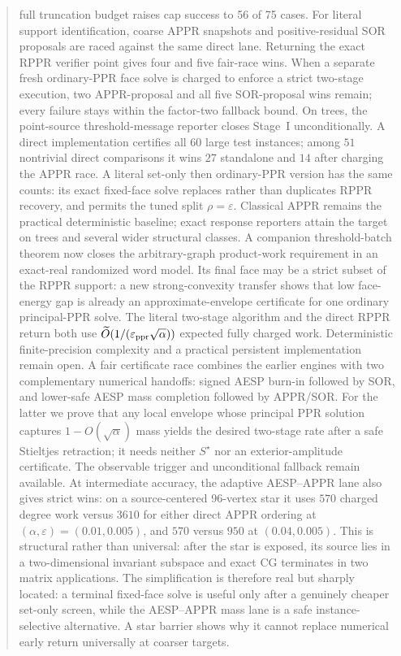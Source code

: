 \documentclass[11pt]{article}
\begin{document}
\begin{abstract}
full truncation budget raises cap success to 56 of 75 cases.
For literal support identification, coarse APPR snapshots and
positive-residual SOR proposals are raced against the same direct lane.
Returning the exact RPPR verifier point gives four and five fair-race wins.
When a separate fresh ordinary-PPR face solve is charged to enforce a strict
two-stage execution, two APPR-proposal and all five SOR-proposal wins remain;
every failure stays within the factor-two fallback bound.
On trees, the point-source threshold-message reporter closes Stage~I
unconditionally.  A direct implementation certifies all $60$ large test
instances; among $51$ nontrivial direct comparisons it wins $27$ standalone
and $14$ after charging the APPR race.  A literal set-only then ordinary-PPR
version has the same counts: its exact fixed-face solve replaces rather than
duplicates RPPR recovery, and permits the tuned split $\rho=\varepsilon$.
Classical APPR remains the practical deterministic baseline; exact response
reporters attain the target on trees and several wider structural classes.
A companion threshold-batch theorem now closes the arbitrary-graph
product-work requirement in an exact-real randomized word model.  Its final
face may be a strict subset of the RPPR support: a new strong-convexity
transfer shows that low face-energy gap is already an approximate-envelope
certificate for one ordinary principal-PPR solve.  The literal two-stage
algorithm and the direct RPPR return both use
$\widetilde O(1/(\varepsilon_{\rm ppr}\sqrt\alpha))$ expected fully charged
work.  Deterministic finite-precision complexity and a practical persistent
implementation remain open.  A fair certificate race combines the earlier
engines with two complementary numerical handoffs: signed AESP burn-in followed by
SOR, and lower-safe AESP mass completion followed by APPR/SOR.  For the latter
we prove that any local envelope whose principal PPR solution captures
$1-O(\sqrt\alpha)$ mass yields the desired two-stage rate after a safe
Stieltjes retraction; it needs neither $S^\star$ nor an exterior-amplitude
certificate.  The observable trigger and unconditional fallback remain
available.  At intermediate accuracy, the adaptive AESP--APPR lane also gives
strict wins: on a source-centered 96-vertex star it uses
$570$ charged degree work versus $3610$ for either direct APPR ordering at
$(\alpha,\varepsilon)=(0.01,0.005)$, and $570$ versus $950$ at
$(0.04,0.005)$.  This is structural rather than universal: after the star is
exposed, its source lies in a two-dimensional invariant subspace and exact
CG terminates in two matrix applications.  The simplification is therefore
real but sharply located: a
terminal fixed-face solve is useful only after a genuinely cheaper set-only
screen, while the AESP--APPR mass lane is a safe instance-selective
alternative.  A star barrier shows why it cannot replace numerical early
return universally at coarser targets.
\end{abstract}
\end{document}
